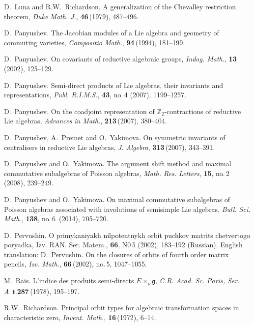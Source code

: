 \begin{thebibliography}{Pa95}
 {\sc D.~Luna} and {\sc R.W.~Richardson}.
A generalization of the Chevalley restriction theorem, {\it Duke Math. J.},
{\bf 46}\,(1979), 487--496.

 {\sc D.~Panyushev}. The Jacobian modules of a Lie algebra and 
geometry of commuting varieties, {\it Compositio Math.}, {\bf 94}\,(1994), 181--199.

 {\sc D.~Panyushev}.
On covariants of reductive algebraic groups,
{\it Indag. Math.}, {\bf 13}\,(2002), 125--129.

 {\sc D.~Panyushev}.
Semi-direct products of Lie algebras, their invariants and representations,
{\it Publ. R.I.M.S.}, {\bf 43}, no.\,4 (2007), 1199--1257.

 {\sc D.~Panyushev}.
On the coadjoint representation of $\mathbb Z_2$-contractions of reductive Lie algebras,
{\it Advances in Math.}, {\bf 213}\,(2007), 380--404. 

 {\sc D.~Panyushev}, {\sc A.~Premet} and {\sc O.~Yakimova}. 
On symmetric invariants of centralisers in reductive  Lie algebras, 
{\it J. Algebra}, {\bf 313}\,(2007), 343--391.

 {\sc D.~Panyushev} and {\sc O.~Yakimova}.  
The argument shift method and maximal commutative
subalgebras of Poisson algebras, {\it Math. Res. Letters}, 
{\bf 15}, no.\,2 (2008), 239--249.

 {\sc D.~Panyushev} and {\sc O.~Yakimova}. 
On maximal commutative subalgebras of Poisson algebras associated with involutions of semisimple
Lie algebras, {\it Bull. Sci. Math.}, {\bf 138}, no.\,6~(2014), 705--720.

{{\tencysc\cyracc} D.~Pervushin}.
{{\tencyr\cyracc} O primykaniyakh nil{\cprime}potentnykh orbit puchkov matrits chetvertogo poryadka},
{{\tencyi\cyracc} Izv. RAN. Ser. Matem.},  {\bf 66}, {{\tencyr\cyracc} N0}\,5 (2002), 183--192 (Russian). 
English translation: {\sc D.~Pervushin}. 
On the closures of orbits of fourth order matrix pencils,
{\it Izv. Math.}, {\bf 66}\,(2002), no.\,5, 1047--1055.

 {\sc M.~Ra\"is}. 
L'indice des produits semi-directs $E\times_{\rho}{{\mathfrak g}}$, 
{\it C.R. Acad. Sc. Paris, Ser. A}\ t.{\bf 287}\,(1978), 195--197.

{\sc R.W.~Richardson}. 
Principal orbit types for algebraic transformation spaces in characteristic zero, 
{\it Invent. Math.}, {\bf 16}\,(1972), 6--14.


\end{thebibliography}
